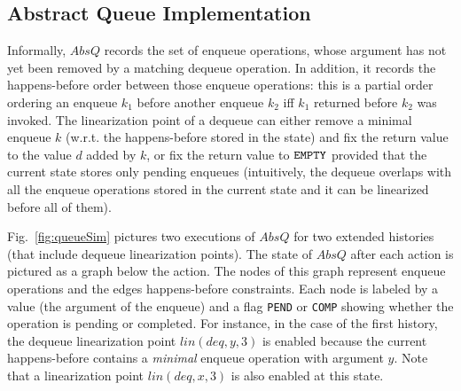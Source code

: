\vspace{-3.5mm}
\subsection{Abstract Queue Implementation}
\vspace{-1.5mm}

Informally, $AbsQ$ records the set of enqueue operations, whose argument has not yet been removed by a matching dequeue operation. In addition, it records the happens-before order between those enqueue operations: this is a partial order ordering an enqueue $k_1$ before another enqueue $k_2$ iff $k_1$ returned before $k_2$ was invoked.
The linearization point of a dequeue can either remove a minimal enqueue $k$ (w.r.t. the happens-before stored in the state) and fix the return value to the value $d$ added by $k$, or fix the return value to ${\tt EMPTY}$ provided that the current state stores only pending enqueues (intuitively, the dequeue overlaps with all the enqueue operations stored in the current state and it can be linearized before all of them).

Fig.~\ref{fig:queueSim} pictures two executions of $AbsQ$ for two extended histories (that include dequeue linearization points). The state of $AbsQ$ after each action is pictured as a graph below the action. The nodes of this graph represent enqueue operations and the edges happens-before constraints. Each node is labeled by a value (the argument of the enqueue) and a flag {\tt PEND} or {\tt COMP} showing whether the operation is pending or completed. For instance, in the case of the first history, the dequeue linearization point $lin(deq,y,3)$ is enabled because the current happens-before contains a \emph{minimal} enqueue operation with argument $y$. Note that a linearization point $lin(deq,x,3)$ is also enabled at this state.

